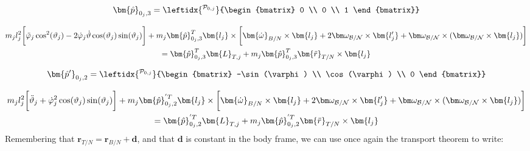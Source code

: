 \begin{equation}
	\bm{\hat{p}}_{0_j,3}=
	\leftidx{^{\mathcal{P}_{0,j}}}
	{\begin{bmatrix}
			0 \\ 0 \\ 1
	\end{bmatrix}}
\end{equation}


\begin{multline}
	m_j l_j^2\bigg[\ddot{\varphi}_j\cos^2(\vartheta_j)-2\dot{\varphi}_j\dot{\vartheta}\cos(\vartheta_j)\sin(\vartheta_j)\bigg] + m_j \bm{\hat{p}}_{0_j,3}^T \bm{l_j}\times \bigg[\bm{\dot{\omega}}_{B/N}\times \bm{l_j} + 2\bm\omega_{\cal B/N}\times \bm{l_j'}+\bm\omega_{\cal B/N}\times(\bm\omega_{\cal B/N}\times \bm{l_j})\bigg]\\
	=\bm{\hat{p}}_{0_j,3}^T \bm{L}_{T,j}+m_{j} \bm{\hat{p}}_{0_j,3}^T \bm{\ddot{r}}_{T/N}\times \bm{l_j}
	\label{eq:FSE4}
\end{multline}

\begin{equation}
	\bm{\hat{p}'}_{0_j,2}=
	\leftidx{^{\mathcal{P}_{0,j}}}
	{\begin{bmatrix}
			-\sin(\varphi) \\ \cos(\varphi) \\ 0
	\end{bmatrix}}
\end{equation}

\begin{multline}
	m_j l_j^2\bigg[\ddot{\vartheta}_j+\dot{\varphi}_j^2\cos(\vartheta_j)\sin(\vartheta_j)\bigg] + m_j \bm{\hat{p}}_{0_j,2}^{'T} \bm{l_j}\times \bigg[\bm{\dot{\omega}}_{B/N}\times \bm{l_j} + 2\bm\omega_{\cal B/N}\times \bm{l_j'}+\bm\omega_{\cal B/N}\times(\bm\omega_{\cal B/N}\times \bm{l_j})\bigg]\\
	=\bm{\hat{p}}_{0_j,2}^{'T} \bm{L}_{T,j}+m_{j} \bm{\hat{p}}_{0_j,2}^{'T} \bm{\ddot{r}}_{T/N}\times \bm{l_j}
	\label{eq:FSE5}
\end{multline}
Remembering that $\bm{r}_{T/N} = \bm{r}_{B/N} + \bm{d}$, and that $\bm{d}$ is constant in the body frame, we can use once again the transport theorem to write:

